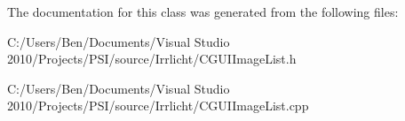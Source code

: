 The documentation for this class was generated from the following files\-:\begin{DoxyCompactItemize}
\item 
C\-:/\-Users/\-Ben/\-Documents/\-Visual Studio 2010/\-Projects/\-P\-S\-I/source/\-Irrlicht/C\-G\-U\-I\-Image\-List.\-h\item 
C\-:/\-Users/\-Ben/\-Documents/\-Visual Studio 2010/\-Projects/\-P\-S\-I/source/\-Irrlicht/C\-G\-U\-I\-Image\-List.\-cpp\end{DoxyCompactItemize}
